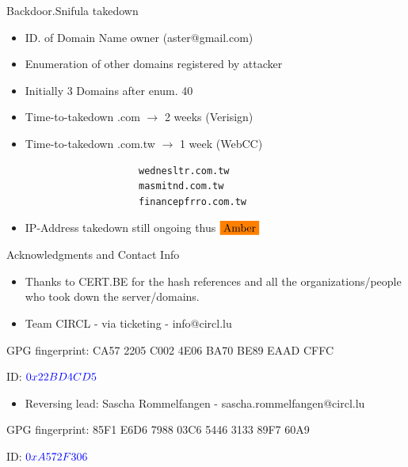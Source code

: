 \begin{frame}[t,fragile]{Backdoor.Snifula takedown}
        \begin{itemize}
                \item ID. of Domain Name owner (aster@gmail.com)
                \item Enumeration of other domains registered by attacker
                \item Initially 3 Domains after enum. 40
                \item Time-to-takedown .com $\rightarrow$ 2 weeks (Verisign)
                \item Time-to-takedown .com.tw $\rightarrow$ 1 week (WebCC)
                    \begin{lstlisting}
                    wednesltr.com.tw
                    masmitnd.com.tw
                    financepfrro.com.tw
                    \end{lstlisting}

                \item IP-Address takedown still ongoing thus $\colorbox{orange}{Amber}$
        \end{itemize}
\end{frame}


\begin{frame}[t,fragile]{Acknowledgments and Contact Info}
\begin{itemize}
        \item Thanks to CERT.BE for the hash references and all the organizations/people who took down the server/domains.
\end{itemize}
\begin{itemize}
        \item Team CIRCL - via ticketing - info@circl.lu
\end{itemize}


        GPG fingerprint: CA57 2205 C002 4E06 BA70 BE89 EAAD CFFC
        
        ID: $\textcolor{blue}{0x22BD 4CD5}$
\begin{itemize}
        \item Reversing lead: Sascha Rommelfangen - sascha.rommelfangen@circl.lu
\end{itemize}
        GPG fingerprint: 85F1 E6D6 7988 03C6 5446 3133 89F7 60A9
        
        ID: $\textcolor{blue}{0xA572 F306}$
\end{frame}